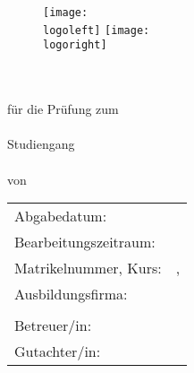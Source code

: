 \begin{titlepage}
	\enlargethispage{2.0cm}
	
	\begin{figure}
		\vspace*{-2cm}
		\texttt{[image: \\logoleft]}
		\hfill
		\texttt{[image: \\logoright]}\\[5ex]
	\end{figure}
	
	\begin{center}
		\begin{minipage}{\widthoftitle\textwidth}
			\centering
			\huge{\textsc{\textbf{\titleofwork}}}
		\end{minipage} \\[8ex]
		\LARGE{\typeofwork}\\[4ex]
		\large{für die Prüfung zum}\\[1ex] 
		\Large{\academicdegree}\\[3ex]
		\LARGE{Studiengang \courseofstudies}\\[1ex] 
		\large{\university}\\[5ex]
		\large{von}\\[1ex] 
		\large{\textbf{\authorofwork}}
	\end{center}
	
	\begin{flushleft}
		\vfill			
		\begin{tabular}{ll} %
			Abgabedatum: 			& \quad \dateofsubmission \\
			Bearbeitungszeitraum: 	& \quad \periodoftime \\ 
			Matrikelnummer, Kurs: 	& \quad \matriculationnumber , \nameofclass \\ 
			Ausbildungsfirma: 		& \quad \company \\ 
									& \quad \companyheadquarter \\ 
			Betreuer/in: 			& \quad \supervisor \\ 
			Gutachter/in: 			& \quad \reviewer	
		\end{tabular} 
	\end{flushleft}	
\end{titlepage}

